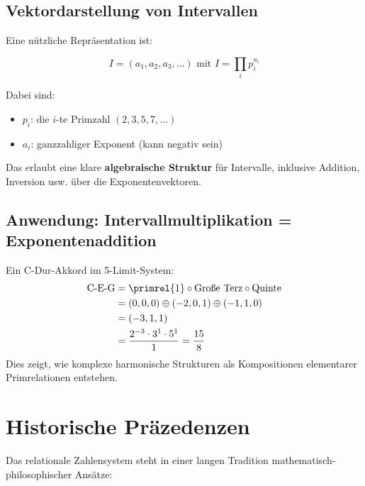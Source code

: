 	\subsection{Vektordarstellung von Intervallen}
	
	Eine nützliche Repräsentation ist:
	
	\begin{definition}
		\begin{equation}
			I = (a_1, a_2, a_3, \ldots) \text{ mit } I = \prod_{i} p_i^{a_i}
		\end{equation}
		
		Dabei sind:
		\begin{itemize}
			\item $p_i$: die $i$-te Primzahl $(2, 3, 5, 7, \ldots)$
			\item $a_i$: ganzzahliger Exponent (kann negativ sein)
		\end{itemize}
	\end{definition}
	
	Das erlaubt eine klare \textbf{algebraische Struktur} für Intervalle, inklusive Addition, Inversion usw. über die Exponentenvektoren.
	
	\subsection{Anwendung: Intervallmultiplikation = Exponentenaddition}
	
	\begin{example}
		Ein C-Dur-Akkord im 5-Limit-System:
		\begin{align}
			\text{C-E-G} &= \primrel{1} \circ \text{Große Terz} \circ \text{Quinte} \\
			&= (0,0,0) \oplus (-2,0,1) \oplus (-1,1,0) \\
			&= (-3,1,1) \\
			&= \frac{2^{-3} \cdot 3^1 \cdot 5^1}{1} = \frac{15}{8}
		\end{align}
		Dies zeigt, wie komplexe harmonische Strukturen als Kompositionen elementarer Primrelationen entstehen.
	\end{example}
	
	\section{Historische Präzedenzen}
	
	Das relationale Zahlensystem steht in einer langen Tradition mathematisch-philosophischer Ansätze:
	
